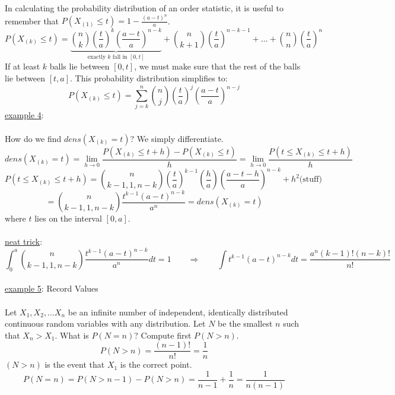 In calculating the probability distribution of an order statistic, it is useful to remember that $P(X_{(1)}\leq t)=1-\frac{(a-t)^n}{a}$.  
$$P(X_{(k)}\leq t)=\underbrace{{n\choose k}{\left(\frac{t}{a}\right)^k}{\left(\frac{a-t}{a}\right)}^{n-k}}_{\mbox{exactly $k$ fall in $[0,t]$}}+{n\choose{k+1}}{\left(\frac{t}{a}\right)}^{n-k-1}+...+{n\choose n}\left(\frac{t}{a}\right)^n$$If at least $k$ balls lie between $[0,t]$, we must make sure that the rest of the balls lie between $[t,a]$.  This probability distribution simplifies to:
$$P(X_{(k)}\leq t)=\displaystyle\sum_{j=k}^{n}{n\choose j} \left(\frac{t}{a}\right)^{j}\left(\frac{a-t}{a}\right)^{n-j}$$
\underline{example 4}:\\\\How do we find $dens(X_{(k)}=t)$?  We simply differentiate.  
$$dens(X_{(k)}=t)=\lim_{h\to 0} \frac{P(X_{(k)}\leq t+h)-P(X_{(k)}\leq t)}{h}=\lim_{h\to 0}\frac{P(t\leq X_{(k)}\leq t+h)}{h}$$
$$P(t\leq X_{(k)}\leq t+h)={n\choose{k-1,1,n-k}}\left(\frac{t}{a}\right)^{k-1}\left(\frac{h}{a}\right)\left(\frac{a-t-h}{a}\right)^{n-k}+h^2\mbox{(stuff)}$$
$$={n\choose{k-1,1,n-k}}\frac{t^{k-1}(a-t)^{n-k}}{a^n}=dens(X_{(k)}=t)$$
where $t$ lies on the interval $[0,a]$.\\\\\underline{neat trick}:\\$$\int_0^a{n\choose{k-1,1,n-k}}\frac{t^{k-1}(a-t)^{n-k}}{a^n}dt=1\qquad\Longrightarrow\qquad\int t^{k-1}(a-t)^{n-k}dt=\frac{a^n(k-1)!(n-k)!}{n!}$$
\\\underline{example 5}: Record Values\\\\
Let $X_1, X_2,...X_n$ be an infinite number of independent, identically distributed continuous random variables with any distribution.  Let $N$ be the smallest $n$ such that $X_n>X_1$.  What is $P(N=n)$?  Compute first $P(N>n)$.
$$P(N>n)=\frac{(n-1)!}{n!}=\frac{1}{n}$$ $(N>n)$ is the event that $X_1$ is the correct point.
$$P(N=n)=P(N>n-1)-P(N>n)=\frac{1}{n-1}+\frac{1}{n}=\frac{1}{n(n-1)}$$
